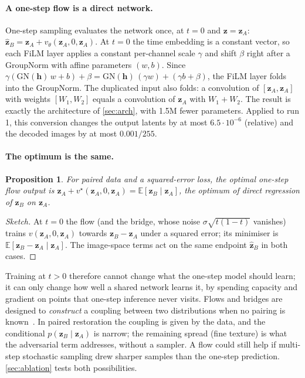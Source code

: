 \documentclass[10pt,twocolumn,letterpaper]{article}
\newtheorem{proposition}{Proposition}
\newcommand{\zA}{\bm{z}_A}
\newcommand{\zB}{\bm{z}_B}
\newcommand{\hzB}{\hat{\bm{z}}_B}
\newcommand{\E}{\mathbb{E}}
\begin{document}
\paragraph{A one-step flow is a direct network.} One-step sampling evaluates the network once, at $t=0$ and
$\bm{z}=\zA$: $\hzB=\zA+v_\theta(\zA,0,\zA)$. At $t=0$ the time embedding is a constant vector, so each FiLM layer
applies a constant per-channel scale $\gamma$ and shift $\beta$ right after a GroupNorm with affine parameters
$(w,b)$. Since $\gamma(\mathrm{GN}(\bm{h})\,w+b)+\beta=\mathrm{GN}(\bm{h})\,(\gamma w)+(\gamma b+\beta)$, the FiLM layer
folds into the GroupNorm. The duplicated input also folds: a convolution of $[\zA,\zA]$ with weights $[W_1,W_2]$ equals a
convolution of $\zA$ with $W_1+W_2$. The result is exactly the architecture of \cref{sec:arch}, with 1.5M fewer
parameters. Applied to run 1, this conversion changes the output latents by at most $6.5{\cdot}10^{-6}$ (relative)
and the decoded images by at most $0.001/255$.

\paragraph{The optimum is the same.}
\begin{proposition}
For paired data and a squared-error loss, the optimal one-step flow output is
$\zA+v^\star(\zA,0,\zA)=\E[\zB\mid\zA]$, the optimum of direct regression of $\zB$ on $\zA$.
\end{proposition}
\begin{proof}[Sketch]
At $t=0$ the flow (and the bridge, whose noise $\sigma\sqrt{t(1-t)}$ vanishes) trains $v(\zA,0,\zA)$ towards $\zB-\zA$
under a squared error; its minimiser is $\E[\zB-\zA\mid\zA]$. The image-space terms act on the same endpoint
$\hzB$ in both cases.
\end{proof}
Training at $t>0$ therefore cannot change what the one-step model should learn; it can only change how well a shared
network learns it, by spending capacity and gradient on points that one-step inference never visits. Flows and
bridges are designed to \emph{construct} a coupling between two distributions when no pairing is
known~\cite{liu2023flow,lipman2023flow}. In paired restoration the coupling is given by the data, and the conditional
$p(\zB\mid\zA)$ is narrow; the remaining spread (fine texture) is what the adversarial term addresses, without a sampler.
A flow could still help if multi-step stochastic sampling drew sharper samples than the one-step prediction.
\cref{sec:ablation} tests both possibilities.
\end{document}
